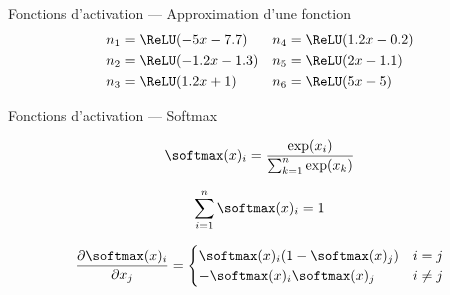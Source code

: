 \begin{frame}{Fonctions d'activation --- Approximation d'une fonction}
  \centering
  {\small
    \begin{align*}
      n_1 & = \ReLU(-5x - 7.7) & n_4 & = \ReLU(1.2x - 0.2) \\
      n_2 & = \ReLU(-1.2x - 1.3) & n_5 & = \ReLU(2x - 1.1) \\
      n_3 & = \ReLU(1.2x + 1) & n_6 & = \ReLU(5x - 5) \\
    \end{align*}
  }
\end{frame}

\begin{frame}{Fonctions d'activation --- Softmax}
  \begin{description}[<+->]
    \item[Définition] \[\softmax(x)_i = \frac{\exp(x_i)}{\sum_{k = 1}^n{\exp(x_k)}}\]
    \item[Propriété] \[\sum_{i = 1}^n{\softmax(x)_i} = 1\]
    \item[Gradient] \[
      \frac{\partial \softmax(x)_i}{\partial x_j} =
        \begin{cases}
          \softmax(x)_i(1 - \softmax(x)_j) & i = j \\
          -\softmax(x)_i\softmax(x)_j & i \neq j
        \end{cases}
      \]
  \end{description}
  
\end{frame}
